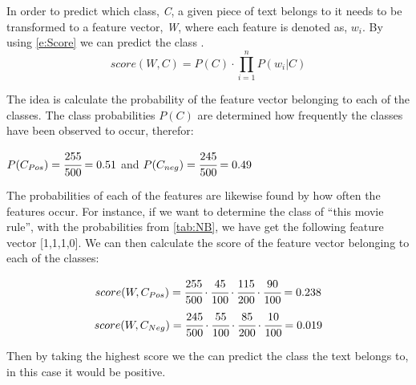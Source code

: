 In order to predict which class, \textit{C}, a given piece of text belongs to it
needs to be transformed to a feature vector, \textit{W}, where each feature is
denoted as, $w_{i}$. By using \autoref{e:Score} we can predict the class \citep[Ch.2.1]{Bayes}.
\begin{equation}\label{e:Score}
score(W,C) = P(C) \cdot \displaystyle\prod_{i=1}^{n}P(w_{i}|C)
\end{equation}

The idea is calculate the probability of the feature vector belonging to each of
the classes. The class probabilities $P(C)$ are determined how frequently the classes have
been observed to occur, therefor:
\begin{center}
$P(C_{Pos}) = \cfrac{255}{500} = 0.51 $ and $P(C_{neg}) = \cfrac{245}{500} =
0.49 $
\end{center}
The probabilities of each of the features are likewise found by how often the
features occur. For instance, if we want to determine the class of ``this
movie rule'', with the probabilities from \autoref{tab:NB}, we have get the
following feature vector [1,1,1,0]. We can then calculate the score of
the feature vector belonging to each of the classes:

\begin{equation}\label{e:Pos}
score(W, C_{Pos}) = \cfrac{255}{500} \cdot \cfrac{45}{100} \cdot
\cfrac{115}{200} \cdot \cfrac{90}{100} = 0.238
\end{equation}
\begin{equation}\label{e:Neg}
score(W, C_{Neg}) = \cfrac{245}{500} \cdot \cfrac{55}{100} \cdot \cfrac{85}{200}
\cdot \cfrac{10}{100} = 0.019
\end{equation}

Then by taking the highest score we the can predict the class the text belongs
to, in this case it would be positive.


